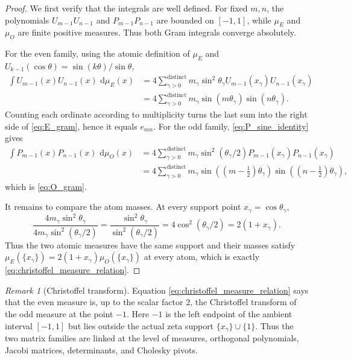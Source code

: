 \documentclass[preprint,12pt]{elsarticle}
\numberwithin{equation}{section}
\theoremstyle{plain}
\theoremstyle{definition}
\theoremstyle{remark}
\newtheorem{remark}[theorem]{Remark}
\newcommand{\dd}{\,\mathrm d}
\begin{document}
\begin{proof}
We first verify that the integrals are well defined.  For fixed $m,n$, the polynomials $U_{m-1}U_{n-1}$ and $P_{m-1}P_{n-1}$ are bounded on $[-1,1]$, while $\mu_E$ and $\mu_O$ are finite positive measures.  Thus both Gram integrals converge absolutely.

For the even family, using the atomic definition of $\mu_E$ and $U_{k-1}(\cos\theta)=\sin(k\theta)/\sin\theta$,
\begin{align}
\int U_{m-1}(x)U_{n-1}(x)\,\dd\mu_E(x)
&=4\sum_{\gamma>0}^{\mathrm{distinct}}m_\gamma\sin^2\theta_\gamma
U_{m-1}(x_\gamma)U_{n-1}(x_\gamma)\\
&=4\sum_{\gamma>0}^{\mathrm{distinct}}m_\gamma
\sin(m\theta_\gamma)\sin(n\theta_\gamma).
\end{align}
Counting each ordinate according to multiplicity turns the last sum into the right side of \eqref{eq:E_gram}, hence it equals $e_{mn}$.  For the odd family, \eqref{eq:P_sine_identity} gives
\begin{align}
\int P_{m-1}(x)P_{n-1}(x)\,\dd\mu_O(x)
&=4\sum_{\gamma>0}^{\mathrm{distinct}}m_\gamma\sin^2(\theta_\gamma/2)
P_{m-1}(x_\gamma)P_{n-1}(x_\gamma)\\
&=4\sum_{\gamma>0}^{\mathrm{distinct}}m_\gamma
\sin((m-\tfrac12)\theta_\gamma)
\sin((n-\tfrac12)\theta_\gamma),
\end{align}
which is \eqref{eq:O_gram}.

It remains to compare the atom masses.  At every support point $x_\gamma=\cos\theta_\gamma$,
\begin{equation}
\frac{4m_\gamma\sin^2\theta_\gamma}
{4m_\gamma\sin^2(\theta_\gamma/2)}
=\frac{\sin^2\theta_\gamma}{\sin^2(\theta_\gamma/2)}
=4\cos^2(\theta_\gamma/2)=2(1+x_\gamma).
\label{eq:weight_ratio}
\end{equation}
Thus the two atomic measures have the same support and their masses satisfy
$\mu_E(\{x_\gamma\})=2(1+x_\gamma)\mu_O(\{x_\gamma\})$ at every atom, which is exactly \eqref{eq:christoffel_measure_relation}.
\end{proof}

\begin{remark}[Christoffel transform]
\label{rem:christoffel_transform}
Equation \eqref{eq:christoffel_measure_relation} says that the even measure is, up to the scalar factor $2$, the Christoffel transform of the odd measure at the point $-1$. Here $-1$ is the left endpoint of the ambient interval $[-1,1]$ but lies outside the actual zeta support $\{x_\gamma\}\cup\{1\}$. Thus the two matrix families are linked at the level of measures, orthogonal polynomials, Jacobi matrices, determinants, and Cholesky pivots.
\end{remark}
\end{document}
